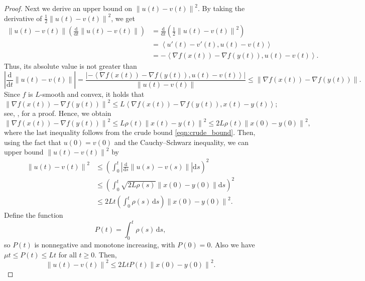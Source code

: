 \documentclass{toc}
\newcommand{\dif}{\mathrm{d}}
\newcommand{\norm}[1]{\left\lVert #1 \right\rVert}
\newcommand{\ip}[2]{\left\langle #1 , #2 \right\rangle}
\newcommand{\grad}{\nabla}
\begin{document}
\begin{proof}
	Next we derive an upper bound on $\norm{u(t)-v(t)}^2$. 
	By taking the derivative of $\frac{1}{2} \norm{u(t)-v(t)}^2$, we get
	\begin{align*}
		\norm{u(t)-v(t)} \left( \frac{\dif}{\dif t} \norm{u(t)-v(t)} \right) 
		&= \frac{\dif}{\dif t} \left( \frac{1}{2} \norm{u(t)-v(t)}^2 \right)\\ 
		&= \ip{u'(t)-v'(t)}{u(t)-v(t)}\\ 
		&= - \ip{\grad f(x(t)) - \grad f(y(t))}{u(t)-v(t)}.
	\end{align*}
Thus, its absolute value is 
%
not greater than  %
	\[
	\left| \frac{\dif}{\dif t} \norm{u(t)-v(t)} \right| = \frac{\left| - \ip{\grad f(x(t)) - \grad f(y(t))}{u(t)-v(t)} \right|}{\norm{u(t)-v(t)}} \le \norm{\grad f(x(t)) - \grad f(y(t))}.
	\]
	Since $f$ is $L$-smooth and convex, it holds that 
	\[
	\norm{\grad f(x(t)) - \grad f(y(t))}^2 \le L \ip{\grad f(x(t)) - \grad f(y(t))}{x(t)-y(t)}; 
	\] 
	see, \eg, \cite[Lemma 4]{Zhou18} for a proof. Hence, we obtain 
	\[
	\norm{\grad f(x(t)) - \grad f(y(t))}^2 
	\le L\rho(t) \norm{x(t)-y(t)}^2 \le 2L\rho(t) \norm{x(0)-y(0)}^2,
	\]
	where the last inequality follows from the crude bound \eqref{eqn:crude_bound}. 
Then, using the fact that $u(0)=v(0)$ and the Cauchy--Schwarz inequality, we can upper bound $\norm{u(t)-v(t)}^2$ by
	\begin{align*}
		\norm{u(t)-v(t)}^2 
		&\le \left( \int_{0}^t \left| \frac{\dif}{\dif s} \norm{u(s)-v(s)} \right| \dif s \right)^2\\ 
		&\le \left( \int_{0}^t \sqrt{2L\rho(s)} \norm{x(0)-y(0)} \dif s \right)^2\\ 
		&\le 2L t \left( \int_{0}^t \rho(s) \,\dif s \right) \norm{x(0)-y(0)}^2. 
	\end{align*}
	Define the function
	\[
	P(t) = \int_{0}^t \rho(s) \,\dif s,
	\]
	so $P(t)$ is nonnegative and monotone increasing, with $P(0) = 0$. Also we have $\mu t \le P(t) \le Lt$ for all $t\geq 0$. Then, 
	\begin{equation}\label{eqn:bound_u-v}
	\norm{u(t)-v(t)}^2 \le 2Lt P(t) \norm{x(0)-y(0)}^2.
	\end{equation}
	

\end{proof}
\end{document}

